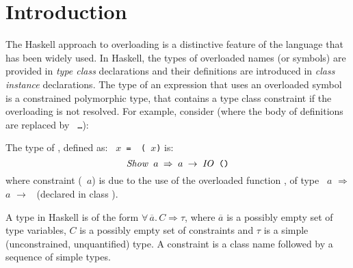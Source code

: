 \section{Introduction}
\label{sec:intro}

The Haskell approach to overloading
\cite{ghc-users-guide,MarkJones94a} is a distinctive feature of the
language that has been widely used. In Haskell, the types of
overloaded names (or symbols) are provided in {\em type class\/}
declarations and their definitions are introduced in {\em class
  instance\/} declarations. The type of an expression that uses an
overloaded symbol is a constrained polymorphic type, that contains a
type class constraint if the overloading is not resolved. For example,
consider (where the body of definitions are replaced by {\tt
  \ldots}):

The type of \print, defined as: \texttt{\print\ $x$ =
  \putStrLn\ (\sshow\ $x$)} is: \[ \texttt{{\it Show\/}\ $a$ $\Rightarrow$
  $a$ $\rightarrow$ {\it IO\/}\ ()} \] where constraint
(\texttt{\SShow\ $a$}) is due to the use of the overloaded function
\sshow, of type \SShow\ $a$ $\Rightarrow$ $a$ $\rightarrow$
\String\ (declared in class \SShow).

A type in Haskell is of the form $\forall\,\overline{a}.\,C
\Rightarrow \tau$, where $\overline{a}$ is a possibly empty set of
type variables, $C$ is a possibly empty set of constraints and $\tau$
is a simple (unconstrained, unquantified) type. A constraint is a
class name followed by a sequence of simple types.

